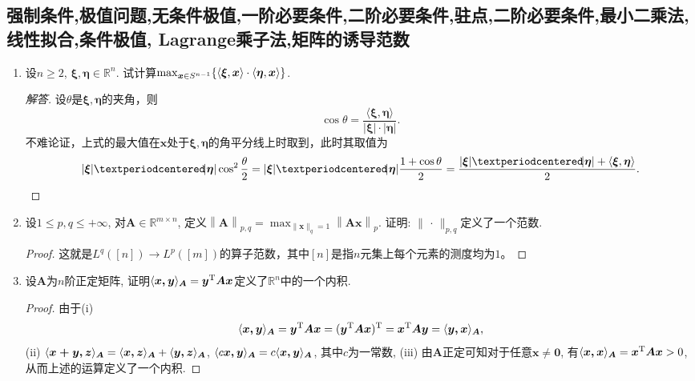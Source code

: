 \subsection{强制条件,极值问题,无条件极值,一阶必要条件,二阶必要条件,驻点,二阶必要条件,最小二乘法,线性拟合,条件极值, Lagrange乘子法,矩阵的诱导范数}
\begin{2a}
\begin{enumerate}
\item 设\(n\geqslant 2\), \(\boldsymbol{\xi},\boldsymbol{\eta}\in\mathbb{R}^n\). 
试计算\(\max_{\boldsymbol{x}\in S^{n-1}}
\{\langle \boldsymbol{\xi},\boldsymbol{x} \rangle\cdot\langle \boldsymbol{\eta},\boldsymbol{x} \rangle\}\).
\begin{proof}[解答]
设$\theta$是$\boldsymbol{\xi},\boldsymbol{\eta}$的夹角，则
\[\cos\theta=\frac{\langle\boldsymbol{\xi},\boldsymbol{\eta}\rangle}{|\boldsymbol{\xi}|·\!|\boldsymbol{\eta}|}.\]
不难论证，上式的最大值在$\boldsymbol{x}$处于$\boldsymbol{\xi},\boldsymbol{\eta}$的角平分线上时取到，此时其取值为
\[|\boldsymbol{\xi}|·\!|\boldsymbol{\eta}|\cos^2\frac{\theta}{2}
=|\boldsymbol{\xi}|·\!|\boldsymbol{\eta}|\frac{1+\cos\theta}{2}
=\frac{|\boldsymbol{\xi}|·\!|\boldsymbol{\eta}|+\langle\boldsymbol{\xi},\boldsymbol{\eta}\rangle}{2}.\qedhere\]
\end{proof}

\item 设\(1\leqslant p,q\leqslant+\infty\), 
对\(\boldsymbol{A}\in\mathbb{R}^{m\times n}\), 
定义\(\left\|\boldsymbol{A}\right\|_{p,q}
=\max_{\|\boldsymbol{x}\|_q=1}\left\|\boldsymbol{Ax}\right\|_p\). 
证明: \(\|\,\cdot\,\|_{p,q}\)定义了一个范数.
\begin{proof}
这就是$L^q([n]) \to L^p([m])$的算子范数，其中$[n]$是指$n$元集上每个元素的测度均为$1$。
\end{proof}

\item 设\(\boldsymbol{A}\)为\(n\)阶正定矩阵, 
证明\(\langle \boldsymbol{x,y} \rangle_{\boldsymbol{A}}
=\boldsymbol{y}^{\mathrm{T}}\boldsymbol{Ax}\)定义了\(\mathbb{R}^n\)中的一个内积.
\begin{proof}
由于(i)\[\langle \boldsymbol{x,y} \rangle_{\boldsymbol{A}}
=\boldsymbol{y}^{\rm T}\boldsymbol{Ax}
=(\boldsymbol{y}^{\rm T}\boldsymbol{Ax})^{\rm T}
=\boldsymbol{x}^{\rm T}\boldsymbol{Ay}=\langle \boldsymbol{y,x} \rangle_{\boldsymbol{A}},\]
(ii) \(\langle \boldsymbol{x+y,z} \rangle_{\boldsymbol{A}}=\langle \boldsymbol{x,z} \rangle_{\boldsymbol{A}}+\langle \boldsymbol{y,z} \rangle_{\boldsymbol{A}}\), 
\(\langle c\boldsymbol{x,y} \rangle_{\boldsymbol{A}}=c\langle \boldsymbol{x,y} \rangle_{\boldsymbol{A}}\), 其中\(c\)为一常数, 
(iii) 由\(\boldsymbol{A}\)正定可知对于任意\(\boldsymbol{x}\ne\boldsymbol{0}\), 
有\(\langle \boldsymbol{x,x} \rangle_{\boldsymbol{A}}=\boldsymbol{x}^{\rm T}\boldsymbol{Ax}>0\), 从而上述的运算定义了一个内积.
\end{proof}


\end{enumerate}
\end{2a}

